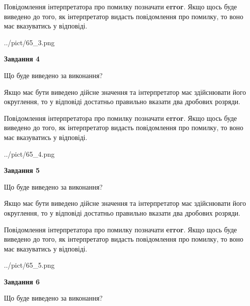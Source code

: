 \documentclass[12pt, ukrainian]{article}
\begin{document}
{\begin {Large}
Повідомлення інтерпретатора про помилку позначати \textbf{error}.
Якщо щось буде виведено до того, як інтерпретатор видасть повідомлення про помилку, 
то воно має вказуватись у відповіді. \par

\begin{center}
	{../pict/65_3.png}
\end{center}
\newpage

{\begin {center}\textbf{Завдання 4}\end {center}}\par
Що буде виведено за виконання? \par

Якщо має бути виведено дійсне значення та інтерпретатор має здійснювати його округлення, 
то у відповіді достатньо правильно вказати два дробових розряди.

Повідомлення інтерпретатора про помилку позначати \textbf{error}.
Якщо щось буде виведено до того, як інтерпретатор видасть повідомлення про помилку, 
то воно має вказуватись у відповіді. \par

\begin{center}
	{../pict/65_4.png}
\end{center}
\newpage

{\begin {center}\textbf{Завдання 5}\end {center}}\par
Що буде виведено за виконання? \par

Якщо має бути виведено дійсне значення та інтерпретатор має здійснювати його округлення, 
то у відповіді достатньо правильно вказати два дробових розряди.

Повідомлення інтерпретатора про помилку позначати \textbf{error}.
Якщо щось буде виведено до того, як інтерпретатор видасть повідомлення про помилку, 
то воно має вказуватись у відповіді. \par

\begin{center}
	{../pict/65_5.png}
\end{center}
\newpage

{\begin {center}\textbf{Завдання 6}\end {center}}\par
Що буде виведено за виконання? \par


\end{Large}}
\end{document}
